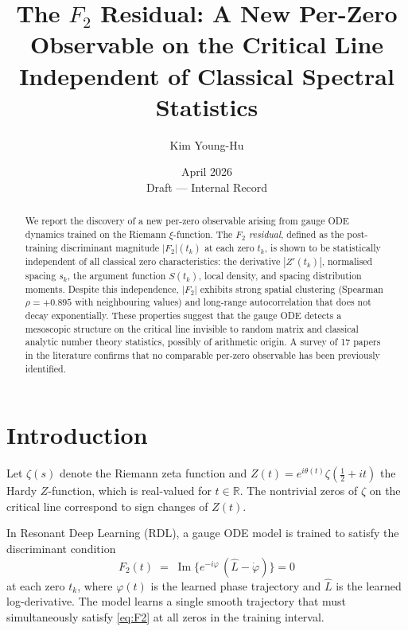 \documentclass[11pt,a4paper]{article}
\title{%
  The $F_2$ Residual: A New Per-Zero Observable on the Critical Line\\
  Independent of Classical Spectral Statistics%
}
\author{Kim Young-Hu}
\date{April 2026 \\ \small Draft — Internal Record}
\newcommand{\R}{\mathbb{R}}
\newcommand{\Ftwo}{|F_2|}
\begin{document}
\maketitle

\begin{abstract}
We report the discovery of a new per-zero observable arising from gauge ODE dynamics
trained on the Riemann $\xi$-function.
The \emph{$F_2$ residual}, defined as the post-training discriminant magnitude $\Ftwo(t_k)$
at each zero $t_k$, is shown to be statistically independent of all classical zero
characteristics: the derivative $|Z'(t_k)|$, normalised spacing $s_k$,
the argument function $S(t_k)$, local density, and spacing distribution moments.
Despite this independence, $\Ftwo$ exhibits strong spatial clustering
(Spearman $\rho = +0.895$ with neighbouring values) and long-range autocorrelation
that does not decay exponentially.
These properties suggest that the gauge ODE detects a mesoscopic structure
on the critical line invisible to random matrix and classical analytic number theory statistics,
possibly of arithmetic origin.
A survey of 17 papers in the literature confirms that no comparable per-zero observable
has been previously identified.
\end{abstract}

\section{Introduction}

Let $\zeta(s)$ denote the Riemann zeta function and
$Z(t) = e^{i\theta(t)}\zeta(\tfrac{1}{2}+it)$ the Hardy $Z$-function,
which is real-valued for $t \in \R$.
The nontrivial zeros of $\zeta$ on the critical line correspond to sign changes of $Z(t)$.

In Resonant Deep Learning (RDL), a gauge ODE model is trained to satisfy
the discriminant condition
\begin{equation}\label{eq:F2}
  F_2(t) \;=\; \operatorname{Im}\!\bigl\{e^{-i\varphi}\,(\hat{L} - \dot{\varphi})\bigr\} = 0
\end{equation}
at each zero $t_k$, where $\varphi(t)$ is the learned phase trajectory and
$\hat{L}$ is the learned log-derivative.
The model learns a single smooth trajectory that must simultaneously satisfy
\eqref{eq:F2} at all zeros in the training interval.
\end{document}
